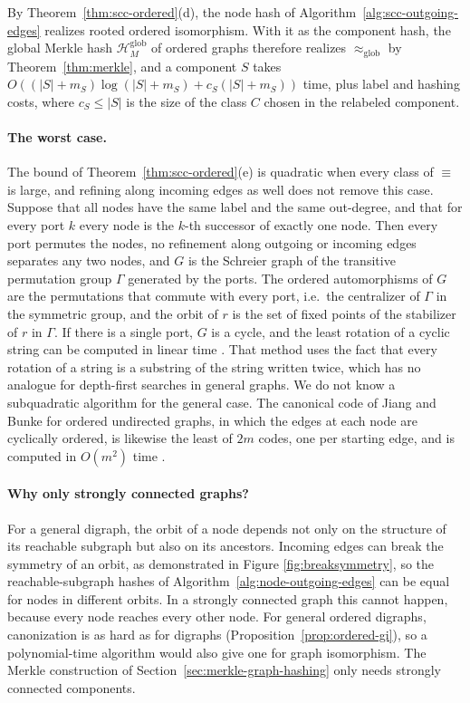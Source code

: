 \documentclass[twoside,leqno]{article}
\newcommand{\HMg}{\mathcal{H}_{M}^{\mathrm{glob}}}
\newcommand{\eqg}{\approx_{\mathrm{glob}}}
\begin{document}
By Theorem~\ref{thm:scc-ordered}(d), the node hash of Algorithm~\ref{alg:scc-outgoing-edges} realizes rooted ordered isomorphism. With it as the component hash, the global Merkle hash $\HMg$ of ordered graphs therefore realizes $\eqg$ by Theorem~\ref{thm:merkle}, and a component $S$ takes $O((|S|+m_S)\log(|S|+m_S)+c_S(|S|+m_S))$ time, plus label and hashing costs, where $c_S\le|S|$ is the size of the class $C$ chosen in the relabeled component.

\paragraph{The worst case.} The bound of Theorem~\ref{thm:scc-ordered}(e) is quadratic when every class of $\equiv$ is large, and refining along incoming edges as well does not remove this case. Suppose that all nodes have the same label and the same out-degree, and that for every port $k$ every node is the $k$-th successor of exactly one node. Then every port permutes the nodes, no refinement along outgoing or incoming edges separates any two nodes, and $G$ is the Schreier graph of the transitive permutation group $\Gamma$ generated by the ports. The ordered automorphisms of $G$ are the permutations that commute with every port, i.e.\ the centralizer of $\Gamma$ in the symmetric group, and the orbit of $r$ is the set of fixed points of the stabilizer of $r$ in $\Gamma$. If there is a single port, $G$ is a cycle, and the least rotation of a cyclic string can be computed in linear time \cite{booth1980lexicographically}. That method uses the fact that every rotation of a string is a substring of the string written twice, which has no analogue for depth-first searches in general graphs. We do not know a subquadratic algorithm for the general case. The canonical code of Jiang and Bunke for ordered undirected graphs, in which the edges at each node are cyclically ordered, is likewise the least of $2m$ codes, one per starting edge, and is computed in $O(m^2)$ time \cite{jiang1998coding,jiang1999optimal}.

\paragraph{Why only strongly connected graphs?} For a general digraph, the orbit of a node depends not only on the structure of its reachable subgraph but also on its ancestors. Incoming edges can break the symmetry of an orbit, as demonstrated in Figure \ref{fig:breaksymmetry}, so the reachable-subgraph hashes of Algorithm~\ref{alg:node-outgoing-edges} can be equal for nodes in different orbits. In a strongly connected graph this cannot happen, because every node reaches every other node. For general ordered digraphs, canonization is as hard as for digraphs (Proposition~\ref{prop:ordered-gi}), so a polynomial-time algorithm would also give one for graph isomorphism. The Merkle construction of Section~\ref{sec:merkle-graph-hashing} only needs strongly connected components.
\end{document}
